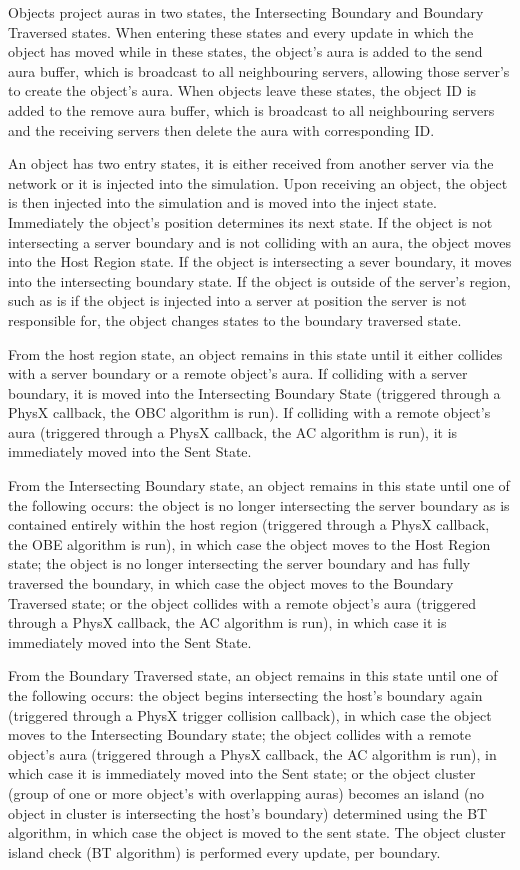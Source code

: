 Objects project auras in two states, the Intersecting Boundary and Boundary Traversed states. When entering these states and every update in which the object has moved while in these states, the object's aura is added to the send aura buffer, which is broadcast to all neighbouring servers, allowing those server's to create the object's aura. When objects leave these states, the object ID is added to the remove aura buffer, which is broadcast to all neighbouring servers and the receiving servers then delete the aura with corresponding ID.

An object has two entry states, it is either received from another server via the network or it is injected into the simulation. Upon receiving an object, the object is then injected into the simulation and is moved into the inject state. Immediately the object's position determines its next state. If the object is not intersecting a server boundary and is not colliding with an aura, the object moves into the Host Region state. If the object is intersecting a sever boundary, it moves into the intersecting boundary state. If the object is outside of the server's region, such as is if the object is injected into a server at position the server is not responsible for, the object changes states to the boundary traversed state.

From the host region state, an object remains in this state until it either collides with a server boundary or a remote object's aura. If colliding with a server boundary, it is moved into the Intersecting Boundary State (triggered through a PhysX callback, the OBC algorithm is run). If colliding with a remote object's aura (triggered through a PhysX callback, the AC algorithm is run), it is immediately moved into the Sent State.

From the Intersecting Boundary state, an object remains in this state until one of the following occurs: the object is no longer intersecting the server boundary as is contained entirely within the host region (triggered through a PhysX callback, the OBE algorithm is run), in which case the object moves to the Host Region state; the object is no longer intersecting the server boundary and has fully traversed the boundary, in which case the object moves to the Boundary Traversed state; or the object collides with a remote object's aura (triggered through a PhysX callback, the AC algorithm is run), in which case it is immediately moved into the Sent State.

From the Boundary Traversed state, an object remains in this state until one of the following occurs: the object begins intersecting the host's boundary again (triggered through a PhysX trigger collision callback), in which case the object moves to the Intersecting Boundary state; the object collides with a remote object's aura (triggered through a PhysX callback, the AC algorithm is run), in which case it is immediately moved into the Sent state; or the object cluster (group of one or more object's with overlapping auras) becomes an island (no object in cluster is intersecting the host's boundary) determined using the BT algorithm, in which case the object is moved to the sent state. The object cluster island check (BT algorithm) is performed every update, per boundary.

